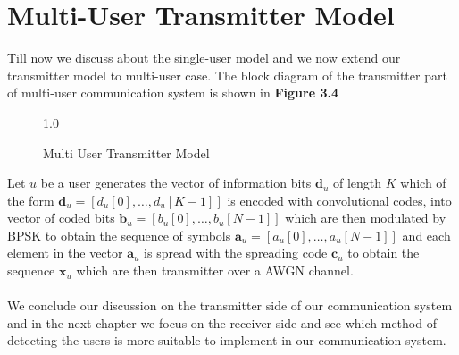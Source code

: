 \section{Multi-User Transmitter Model}
Till now we discuss about the single-user model and we now extend our transmitter model to multi-user case. The block diagram of the transmitter part of multi-user communication system is shown in \textbf{Figure 3.4}
\begin{figure}[htb]
\centerline{  {1.0} }
\caption{Multi User Transmitter Model}
\end{figure}
Let $u$ be a user generates the vector of information bits $\mathrm{\mathbf{d}}_u$ of length $K$ which of the form $\mathrm{\mathbf{d}}_u=[d_u[0],\dots,d_u[K-1]]$ is encoded with convolutional codes, into vector of coded bits $\mathrm{\mathbf{b}}_u=[b_u[0],\dots,b_u[N-1]]$ which are then modulated by BPSK to obtain the sequence of symbols $\mathrm{\mathbf{a}}_u=[a_u[0],\dots,a_u[N-1]]$ and each element in the vector $\mathrm{\mathbf{a}}_u$ is spread with the spreading code $\mathrm{\mathbf{c}}_u$ to obtain the sequence $\mathrm{\mathbf{x}}_u$ which are then transmitter over a AWGN channel. \\ \\
We conclude our discussion on the transmitter side of our communication system and in the next chapter we focus on the receiver side and see which method of detecting the users is more suitable to implement in our communication system.
